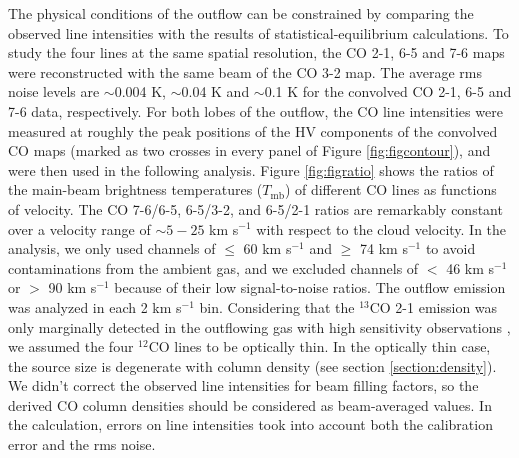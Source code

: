 The physical conditions of the outflow can be constrained by comparing the observed line intensities with the results of statistical-equilibrium calculations. To study the four lines at the same spatial resolution, the CO 2-1, 6-5 and 7-6 maps were reconstructed with the same beam of the CO 3-2 map. The average rms noise levels are $\sim$0.004 K, $\sim$0.04 K and $\sim$0.1 K for the convolved CO 2-1, 6-5 and 7-6 data, respectively. For both lobes of the outflow, the CO line intensities were measured at roughly the peak positions of the HV components of the convolved CO maps (marked as two crosses in every panel of Figure \ref{fig:figcontour}), and were then used in the following analysis. Figure \ref{fig:figratio} shows the ratios of the main-beam brightness temperatures ($T_{\mathrm{mb}}$) of different CO lines as functions of velocity. The CO 7-6/6-5, 6-5/3-2, and 6-5/2-1 ratios are remarkably constant over a velocity range of $\sim 5-25$ km s$^{-1}$ with respect to the cloud velocity. In the analysis, we only used channels of $\le$ 60 km s$^{-1}$ and $\ge$ 74 km s$^{-1}$ to avoid contaminations from the ambient gas, and we excluded channels of $<$ 46 km s$^{-1}$ or $>$ 90 km s$^{-1}$ because of their low signal-to-noise ratios. The outflow emission was analyzed in each 2 km s$^{-1}$ bin. Considering that the $^{13}$CO 2-1 emission was only marginally detected in the outflowing gas with high sensitivity observations \citep{2009ApJ...696...66Q}, we assumed the four $^{12}$CO lines to be optically thin. In the optically thin case, the source size is degenerate with column density (see section \ref{section:density}). We didn't correct the observed line intensities for beam filling factors, so the derived CO column densities should be considered as beam-averaged values. In the calculation, errors on line intensities took into account both the calibration error and the rms noise. 

